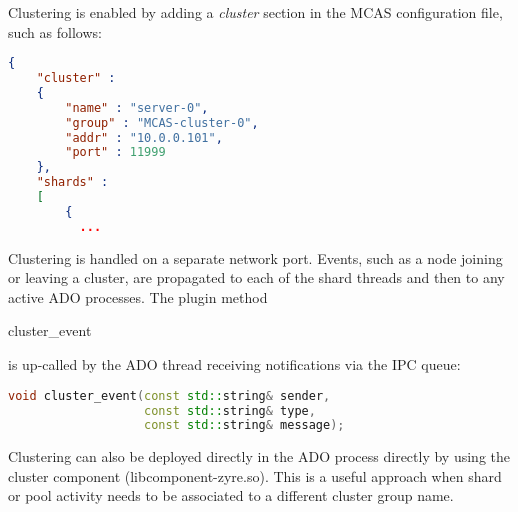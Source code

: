 \documentclass[letterpaper,twocolumn,10pt]{article}
\newcommand{\code}[1]{\begin{ttcodefont}#1\end{ttcodefont}}
\begin{document}
Clustering is enabled by adding a \textit{cluster} section in the MCAS
configuration file, such as follows:

\begin{minipage}{\linewidth}
\begin{lstlisting}[language=json,caption={MCAS Process-level Cluster Configuration},captionpos=b, label={lst:clusterconf}]
{
    "cluster" :
    {
        "name" : "server-0",
        "group" : "MCAS-cluster-0",
        "addr" : "10.0.0.101",
        "port" : 11999
    },    
    "shards" :
    [
        {
          ...
\end{lstlisting}
\end{minipage}

Clustering is handled on a separate network port. Events, such
as a node joining or leaving a cluster, are propagated to each of
the shard threads and then to any active ADO processes. The plugin
method \code{cluster\_event} is up-called by the ADO thread receiving
notifications via the IPC queue:

\begin{minipage}{\linewidth}
\begin{lstlisting}[language=C++, frame=none]
void cluster_event(const std::string& sender,
                   const std::string& type,
                   const std::string& message);
\end{lstlisting}
\end{minipage}

Clustering can also be deployed directly in the ADO process directly
by using the cluster component (libcomponent-zyre.so).  This is a
useful approach when shard or pool activity needs to be associated to
a different cluster group name.



\end{document}
